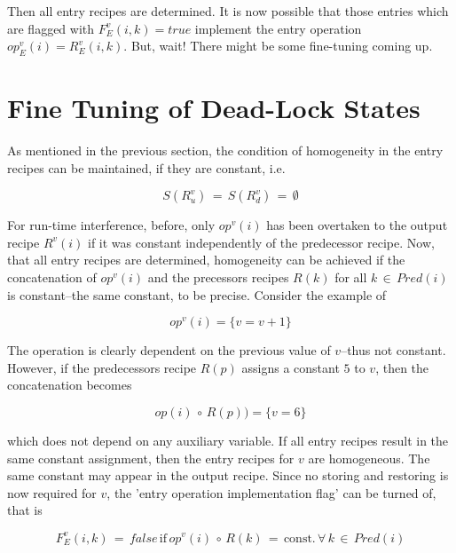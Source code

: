 \documentclass[12pt,a4paper]{scrartcl}
\begin{document}
Then all entry recipes are determined. It is now possible that those entries
which are flagged with $F_E^v(i,k)=true$ implement the entry operation
$op_E^v(i)=R_E^v(i,k)$. But, wait! There might be some fine-tuning coming up.


%
\section{Fine Tuning of Dead-Lock States}

As mentioned in the previous section, the condition of homogeneity in the
entry recipes can be maintained, if they are constant, i.e.

\begin{equation}
     S(R^v_u)\,=\,S(R^v_d)\,=\,\emptyset   
\end{equation}

For run-time interference, before, only $op^v(i)$ has been overtaken to the
output recipe $R^v(i)$ if it was constant independently of the predecessor
recipe. Now, that all entry recipes are determined, homogeneity can be achieved
if the concatenation of $op^v(i)$ and the precessors recipes $R(k)$ for all
$k\,\in\,Pred(i)$ is constant--the same constant, to be precise.  Consider the
example of 

\begin{equation}
                       op^v(i) = \{ v = v + 1 \}
\end{equation}

The operation is clearly dependent on the previous value of $v$--thus not
constant. However, if the predecessors recipe $R(p)$ assigns a constant $5$ to
$v$, then the concatenation becomes

\begin{equation}
                       op(i)\,\circ\,R(p)) = \{ v = 6 \}
\end{equation}

which does not depend on any auxiliary variable. If all entry recipes result in
the same constant assignment, then the entry recipes for $v$ are homogeneous.
The same constant may appear in the output recipe. Since no storing and restoring
is now required for $v$, the 'entry operation implementation flag' can be turned
of, that is

\begin{equation}
    F_E^v(i,k)\,=\,false\,\mbox{if}\,op^v(i)\,\circ\,R(k)\,=\,\mbox{const.}\,\forall\,k\,\in\,Pred(i)
\end{equation}
\end{document}

